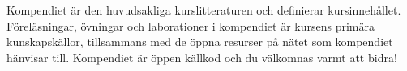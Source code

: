 \fi

\ifkompendium
\noindent Kompendiet är den huvudsakliga kurslitteraturen och definierar kursinnehållet. Föreläsningar, övningar och laborationer i kompendiet är kursens primära kunskapskällor, tillsammans med de öppna resurser på nätet som kompendiet hänvisar till. Kompendiet är öppen källkod och du välkomnas varmt att bidra!

